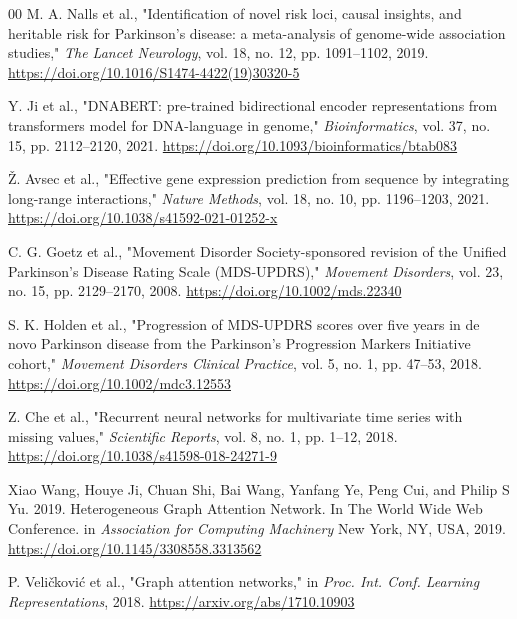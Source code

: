 \documentclass[conference]{IEEEtran}
\begin{document}
\begin{thebibliography}{00}
M. A. Nalls et al., "Identification of novel risk loci, causal insights, and heritable risk for Parkinson's disease: a meta-analysis of genome-wide association studies," \textit{The Lancet Neurology}, vol. 18, no. 12, pp. 1091--1102, 2019. \href{https://doi.org/10.1016/S1474-4422(19)30320-5}{https://doi.org/10.1016/S1474-4422(19)30320-5}

Y. Ji et al., "DNABERT: pre-trained bidirectional encoder representations from transformers model for DNA-language in genome," \textit{Bioinformatics}, vol. 37, no. 15, pp. 2112--2120, 2021. \href{https://doi.org/10.1093/bioinformatics/btab083}{https://doi.org/10.1093/bioinformatics/btab083}

Ž. Avsec et al., "Effective gene expression prediction from sequence by integrating long-range interactions," \textit{Nature Methods}, vol. 18, no. 10, pp. 1196--1203, 2021. \href{https://doi.org/10.1038/s41592-021-01252-x}{https://doi.org/10.1038/s41592-021-01252-x}

C. G. Goetz et al., "Movement Disorder Society-sponsored revision of the Unified Parkinson's Disease Rating Scale (MDS-UPDRS)," \textit{Movement Disorders}, vol. 23, no. 15, pp. 2129--2170, 2008. \href{https://doi.org/10.1002/mds.22340}{https://doi.org/10.1002/mds.22340}

S. K. Holden et al., "Progression of MDS-UPDRS scores over five years in de novo Parkinson disease from the Parkinson's Progression Markers Initiative cohort," \textit{Movement Disorders Clinical Practice}, vol. 5, no. 1, pp. 47--53, 2018. \href{https://doi.org/10.1002/mdc3.12553}{https://doi.org/10.1002/mdc3.12553}

Z. Che et al., "Recurrent neural networks for multivariate time series with missing values," \textit{Scientific Reports}, vol. 8, no. 1, pp. 1--12, 2018. \href{https://doi.org/10.1038/s41598-018-24271-9}{https://doi.org/10.1038/s41598-018-24271-9}

Xiao Wang, Houye Ji, Chuan Shi, Bai Wang, Yanfang Ye, Peng Cui, and Philip S Yu. 2019. Heterogeneous Graph Attention Network. In The World Wide Web Conference. in \textit{Association for Computing Machinery} New York, NY, USA, 2019. \href{https://doi.org/10.1145/3308558.3313562}{https://doi.org/10.1145/3308558.3313562}

P. Veličković et al., "Graph attention networks," in \textit{Proc. Int. Conf. Learning Representations}, 2018. \href{https://arxiv.org/abs/1710.10903}{https://arxiv.org/abs/1710.10903}


\end{thebibliography}
\end{document}
